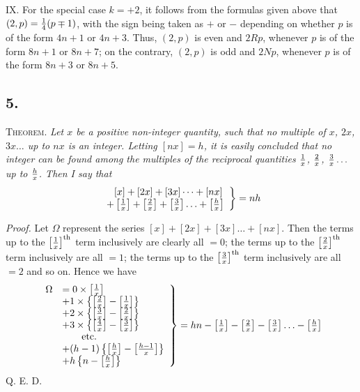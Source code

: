 \documentclass[twoside,12pt]{memoir}
\let\oldfrac\frac
\def\frac#1#2{\mathchoice{\tfrac{#1}{#2}}{\oldfrac{#1}{#2}}{\genfrac{}{}{}{2}{#1}{#2\mathstrut}}{\genfrac{}{}{}{3}{#1}{#2\mathstrut}}}
\begin{document}
IX. For the special case \(k=+2\), it follows from the formulas given above that \((2, p)=\frac{1}{4}(p \mp 1)\), with the sign being taken as \(+\) or \(-\) depending on whether \(p\) is of the form \(4n+1\) or \(4n+3\). Thus, \((2, p)\) is even and \(2 R p\), whenever \(p\) is of the form \(8n+1\) or \(8n+7\); on the contrary, \((2, p)\) is odd and \(2 N p\), whenever \(p\) is of the form \(8n+3\) or \(8n+5\).\pagebreak%

\subsection*{5.}

\textsc{Theorem.} \textit{Let \(x\) be a positive non-integer quantity, such that no multiple of \(x\), \(2x\), \(3x \ldots\) up to \(nx\) is an integer.  Letting \([nx]=h\), it is easily concluded that no integer can be found among the multiples of the reciprocal quantities \(\frac{1}{x}\), \(\frac{2}{x}\), \(\frac{3}{x} \ldots\) up to \(\frac{h}{x}\). Then I say that}
\[\left.\begin{array}{l} 
\phantom{+}[x]+[2x]+[3x]\dots+[nx] \\
+\left[\frac{1}{x}\right]+\left[\frac{2}{x}\right]+\left[\frac{3}{x}\right] \ldots+\left[\frac{h}{x}\right]
\end{array}\right\}=nh\]
 
\textit{Proof.} Let \(\Omega\) represent the series \([x]+[2x]+[3x] \ldots+[nx]\). Then the terms up to the \(\left[\frac{1}{x}\right]^{\text{th}}\) term inclusively are clearly all \(=0\); the terms up to the \(\left[\frac{2}{x}\right]^{\text{th}}\) term inclusively are all \(=1\); the terms up to the \(\left[\frac{3}{x}\right]^{\text{th}}\) term inclusively are all \(=2\) and so on. Hence we have
\[\left.\begin{array}{rl}
{\Omega}&= 0 \times\left[\frac{1}{x}\right] \\
& +1 \times\left\{\left[\frac{2}{x}\right]-\left[\frac{1}{x}\right]\right\} \\
& +2 \times\left\{\left[\frac{3}{x}\right]-\left[\frac{2}{x}\right]\right\} \\
& +3 \times\left\{\left[\frac{4}{x}\right]-\left[\frac{3}{x}\right]\right\} \\
&\qquad \text{etc{.}} \\
& +(h-1)\left\{\left[\frac{h}{x}\right]-\left[\frac{h-1}{x}\right]\right\} \\
& +h\left\{n-\left[\frac{h}{x}\right]\right\}
\end{array}\right\}=hn-\left[\frac{1}{x}\right]-\left[\frac{2}{x}\right]-\left[\frac{3}{x}\right] \ldots-\left[\frac{h}{x}\right]\]
Q. E. D.
\end{document}
